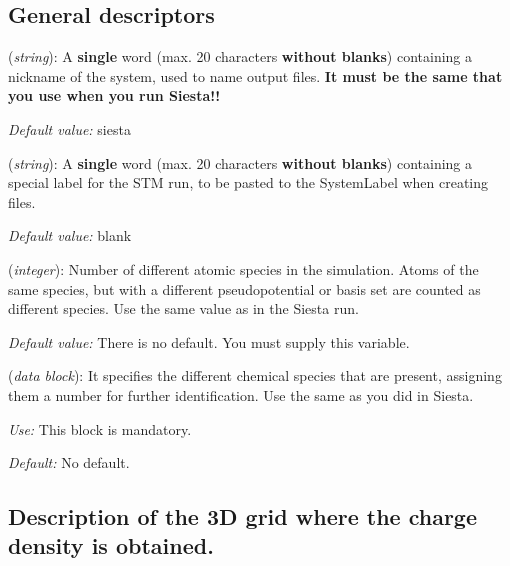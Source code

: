\vspace{5pt}
\subsection{General descriptors}

\begin{description}
\itemsep 10pt
\parsep 0pt

\item[{\bf SystemLabel}] ({\it string}): 
A {\bf single} word (max. 20 characters {\bf without blanks})
containing a nickname of the system, used to name output files. 
{\bf It must be the same that you use when you run {\sc Siesta}!!}

{\it Default value:} siesta

\item[{\bf STM.label}] ({\it string}): 
A {\bf single} word (max. 20 characters {\bf without blanks})
containing a special label for the STM run, to be pasted to the
SystemLabel when creating files.

{\it Default value:} blank

\item[{\bf NumberOfSpecies}] ({\it integer}):
Number of different atomic species in the simulation.
Atoms of the same species, but with a different
pseudopotential or basis set are counted as different species.
Use the same value as in the {\sc Siesta} run.

{\it Default value:} There is no default. You must supply this variable.


\item[{\bf ChemicalSpeciesLabel}] ({\it data block}):
It specifies the different chemical species that are present,
assigning them a number for further identification.
Use the same as you did in {\sc Siesta}.

{\it Use:} This block is mandatory.

{\it Default:} No default.
\end{description}


\vspace{5pt}
\subsection{Description of the 3D grid where the charge density is obtained.}

